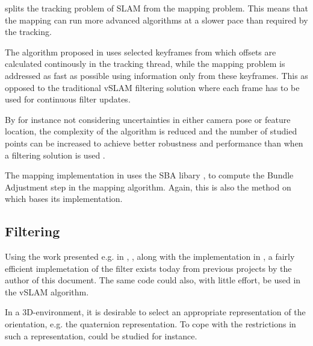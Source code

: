     \cite{klein07parallel} splits the tracking problem of SLAM from the mapping problem.
    This means that the mapping can run more advanced algorithms at a slower
    pace than required by the tracking.
    
    The algorithm proposed in \cite{klein07parallel} uses selected keyframes
    from which offsets are calculated continously in the tracking thread, while
    the mapping problem is addressed as fast as possible using information only
    from these keyframes. This as opposed to the traditional vSLAM filtering
    solution where each frame has to be used for continuous filter updates.
    
    By for instance not considering uncertainties in either camera pose or feature location,
    the complexity of the algorithm is reduced and the number of studied points 
    can be increased to achieve better robustness and performance than 
    when a filtering solution is used \cite{DBLP:conf/icra/StrasdatMD10}.
    
    The mapping implementation in \cite{DBLP:conf/icra/StrasdatMD10} uses the SBA libary \cite{sba},\cite{lour09}
    to compute the Bundle Adjustment step in the mapping algorithm.
    Again, this is also the method on which \cite{weiss11monocular} bases its implementation.
    

    \subsection{Filtering}
    Using the work presented e.g. in \cite{Julier95anewapproach}, \cite{Julier97anew}, \cite{vandermerwe:upf}
    along with the implementation in \cite{bayesclasses}, a fairly
    efficient implemetation of the filter exists today from previous projects by
    the author of this document.
    The same code could also, with little effort, be used in the vSLAM algorithm.
    
    In a 3D-environment, it is desirable to select an appropriate representation
    of the orientation, e.g. the quaternion representation. 
    To cope with the restrictions in such a representation, \cite{DBLP:journals/ras/Ude99}
    could be studied for instance.